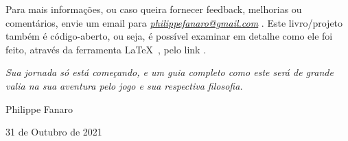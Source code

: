 \bigskip
\bigskip

Para mais informações, ou caso queira fornecer feedback, melhorias ou comentários, envie um email para \emph{\href{mailto:philippefanaro@gmail.com}{philippefanaro@gmail.com}} \cite{fanaro_email}. Este livro/projeto também é código-aberto, ou seja, é possível examinar em detalhe como ele foi feito, através da ferramenta \LaTeX~\cite{latex}, pelo link \href{https://github.com/FanaroEngineering/traducao_como_jogar_go}{}\cite{repo_github}.

\bigskip
\bigskip

\emph{Sua jornada só está começando, e um guia completo como este será de grande valia na sua aventura pelo jogo e sua respectiva filosofia.}

\bigskip
\bigskip

Philippe Fanaro

31 de Outubro de 2021